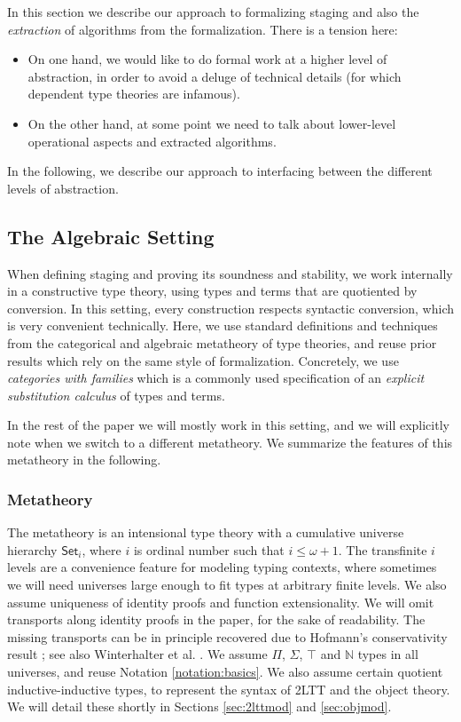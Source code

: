 \documentclass[acmsmall,anonymous,review]{acmart}
\newcommand{\mbb}[1]{\mathbb{#1}}
\newcommand{\Set}{\mathsf{Set}}
\theoremstyle{remark}
\begin{document}
In this section we describe our approach to formalizing staging and also the
\emph{extraction} of algorithms from the formalization. There is a tension
here:
\begin{itemize}
  \item On one hand, we would like to do formal work at a higher level of
    abstraction, in order to avoid a deluge of technical details (for which
    dependent type theories are infamous).
  \item On the other hand, at some point we need to talk about lower-level
    operational aspects and extracted algorithms.
\end{itemize}
In the following, we describe our approach to interfacing between the different levels
of abstraction.

\subsection{The Algebraic Setting}

When defining staging and proving its soundness and stability, we work
internally in a constructive type theory, using types and terms that are
quotiented by conversion. In this setting, every construction respects syntactic
conversion, which is very convenient technically. Here, we use standard
definitions and techniques from the categorical and algebraic metatheory of type
theories, and reuse prior results which rely on the same style of
formalization. Concretely, we use \emph{categories with families} \cite{cwfs}
which is a commonly used specification of an \emph{explicit substitution
calculus} of types and terms.

In the rest of the paper we will mostly work in this setting, and we will
explicitly note when we switch to a different metatheory. We summarize
the features of this metatheory in the following.

\subsubsection{Metatheory}
The metatheory is an intensional type theory with a cumulative universe
hierarchy $\Set_i$, where $i$ is ordinal number such that $i \leq \omega +
1$. The transfinite $i$ levels are a convenience feature for modeling typing
contexts, where sometimes we will need universes large enough to fit
types at arbitrary finite levels. We also assume uniqueness of identity proofs
and function extensionality. We will omit transports along identity proofs in
the paper, for the sake of readability. The missing transports can be in
principle recovered due to Hofmann's conservativity result
\cite{hofmann95extensional}; see also Winterhalter et
al. \cite{DBLP:conf/cpp/WinterhalterST19}. We assume $\Pi$, $\Sigma$, $\top$ and
$\mbb{N}$ types in all universes, and reuse Notation \ref{notation:basics}. We
also assume certain quotient inductive-inductive types, to represent the syntax of 2LTT
and the object theory. We will detail these shortly in Sections \ref{sec:2lttmod}
and \ref{sec:objmod}.
\end{document}
